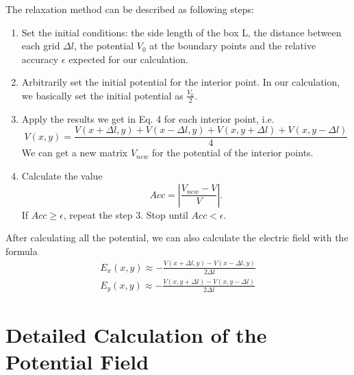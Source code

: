 \documentclass[12pt]{report}
\begin{document}
The relaxation method can be described as following steps:
\begin{enumerate}
    \item Set the initial conditions: the side length of the box L, the distance between each grid $\Delta l$, the potential $V_{0}$ at the boundary points and the relative accuracy $\epsilon$ expected for our calculation.
    \item Arbitrarily set the initial potential for the interior point. In our calculation, we basically set the initial potential as $\frac{V_{0}}{2}$.
    \item Apply the results we get in Eq. 4 for each interior point, i.e.
    $$V(x,y)=\frac{V(x+\Delta l,y)+V(x-\Delta l,y)+V(x,y+\Delta l)+V(x,y-\Delta l)}{4}$$
    We can get a new matrix $V_{new}$ for the potential of the interior points.
    \item Calculate the value
    $$Acc=\left\vert\frac{V_{new}-V}{V}\right\vert.$$
    If $Acc\geq\epsilon$, repeat the step 3. Stop until $Acc<\epsilon$.
\end{enumerate}
After calculating all the potential, we can also calculate the electric field with the formula
\begin{equation}
\begin{split}
    E_{x}(x,y)\approx-\frac{V(x+\Delta l,y)-V(x-\Delta l,y)}{2\Delta l}\\
    E_{y}(x,y)\approx-\frac{V(x,y+\Delta l)-V(x,y-\Delta l)}{2\Delta l}
\end{split}
\end{equation}
\clearpage
\section{Detailed Calculation of the Potential Field}
\end{document}
